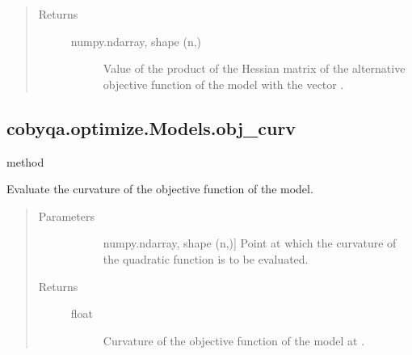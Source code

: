 \documentclass[letterpaper,10pt,english]{sphinxmanual}
\begin{document}
\begin{fulllineitems}
\begin{fulllineitems}
\begin{quote}
\begin{description}
\begin{description}
\end{description}

\item[{Returns}] \leavevmode\begin{description}
\item[{numpy.ndarray, shape (n,)}] \leavevmode
\sphinxAtStartPar
Value of the product of the Hessian matrix of the alternative
objective function of the model with the vector .

\end{description}

\end{description}\end{quote}

\end{fulllineitems}



\subsection{cobyqa.optimize.Models.obj\_curv}
\label{\detokenize{refs/generated/cobyqa.optimize.Models.obj_curv:cobyqa-optimize-models-obj-curv}}\label{\detokenize{refs/generated/cobyqa.optimize.Models.obj_curv::doc}}
\sphinxAtStartPar
method

\begin{fulllineitems}
\label{\detokenize{refs/generated/cobyqa.optimize.Models.obj_curv:cobyqa.optimize.Models.obj_curv}}
\sphinxAtStartPar
Evaluate the curvature of the objective function of the model.
\begin{quote}\begin{description}
\item[{Parameters}] \leavevmode\begin{description}
\item[{}] \leavevmode{[}numpy.ndarray, shape (n,){]}
\sphinxAtStartPar
Point at which the curvature of the quadratic function is to be
evaluated.

\end{description}

\item[{Returns}] \leavevmode\begin{description}
\item[{float}] \leavevmode
\sphinxAtStartPar
Curvature of the objective function of the model at .


\end{description}
\end{description}
\end{quote}
\end{fulllineitems}
\end{fulllineitems}
\end{document}
